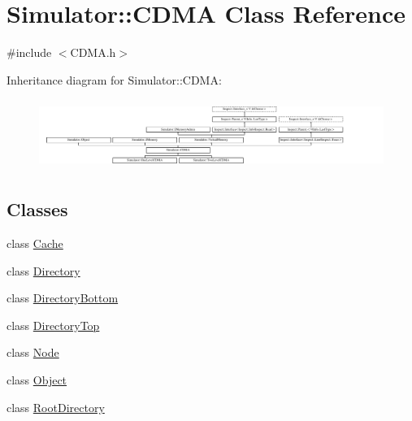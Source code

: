\hypertarget{class_simulator_1_1_c_d_m_a}{\section{Simulator\+:\+:C\+D\+M\+A Class Reference}
\label{class_simulator_1_1_c_d_m_a}
}


{\ttfamily \#include $<$C\+D\+M\+A.\+h$>$}

Inheritance diagram for Simulator\+:\+:C\+D\+M\+A\+:\begin{figure}[H]
\begin{center}
\leavevmode
\includegraphics[height=2.301370cm]{class_simulator_1_1_c_d_m_a}
\end{center}
\end{figure}
\subsection*{Classes}
\begin{DoxyCompactItemize}
\item 
class \hyperlink{class_simulator_1_1_c_d_m_a_1_1_cache}{Cache}
\item 
class \hyperlink{class_simulator_1_1_c_d_m_a_1_1_directory}{Directory}
\item 
class \hyperlink{class_simulator_1_1_c_d_m_a_1_1_directory_bottom}{Directory\+Bottom}
\item 
class \hyperlink{class_simulator_1_1_c_d_m_a_1_1_directory_top}{Directory\+Top}
\item 
class \hyperlink{class_simulator_1_1_c_d_m_a_1_1_node}{Node}
\item 
class \hyperlink{class_simulator_1_1_c_d_m_a_1_1_object}{Object}
\item 
class \hyperlink{class_simulator_1_1_c_d_m_a_1_1_root_directory}{Root\+Directory}
\end{DoxyCompactItemize}
